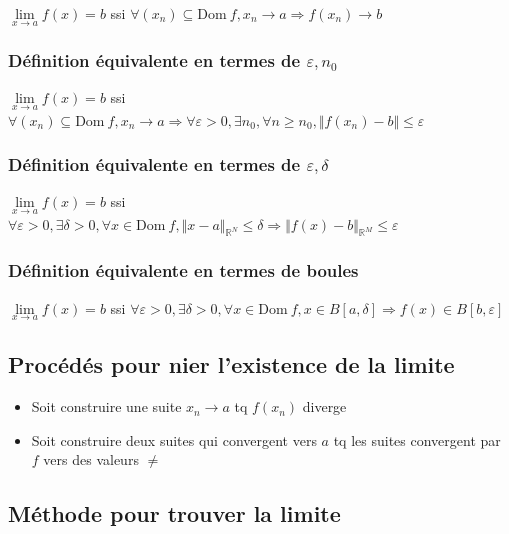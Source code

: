 \documentclass[a4paper,10pt]{article}
\newcommand{\ap}{\rightarrow}
\newcommand{\Dom}{\mathrm{Dom}\:}
\newcommand{\R}{\mathbb{R}}
\newcommand{\so}{\Rightarrow}
\newcommand{\clim}[1]{\lim\limits_{#1}}
\begin{document}
$\clim{x\ap a} f(x) = b$ ssi $\forall (x_n) \subseteq \Dom f, x_n \ap a \so f(x_n) \ap b$

\subsubsection{Définition équivalente en termes de $\varepsilon , n_0$}

$\clim{x\ap a} f(x) = b$ ssi $\forall (x_n) \subseteq \Dom f, x_n \ap a \so \forall \varepsilon > 0, \exists n_0, \forall n \geq n_0, \Vert f(x_n) - b \Vert \leq \varepsilon$

\subsubsection{Définition équivalente en termes de $\varepsilon, \delta$}

$\clim{x\ap a} f(x) = b$ ssi $\forall \varepsilon > 0, \exists \delta >0, \forall x \in \Dom f, {\Vert x - a \Vert}_{\R^N} \leq \delta \so {\Vert f(x) -b \Vert}_{\R^M} \leq \varepsilon$

\subsubsection{Définition équivalente en termes de boules}

$\clim{x\ap a} f(x) = b$ ssi $\forall \varepsilon >0, \exists \delta>0,\forall x \in \Dom f, x \in B[a,\delta] \so f(x) \in B[b,\varepsilon]$



\subsection{Procédés pour nier l'existence de la limite}

\begin{itemize}
	\item{Soit construire une suite $x_n \ap a$ tq $f(x_n)$ diverge}
	\item{Soit construire deux suites qui convergent vers $a$ tq les suites convergent par $f$ vers des valeurs $\neq$}
\end{itemize}

\subsection{Méthode pour trouver la limite}
\end{document}
